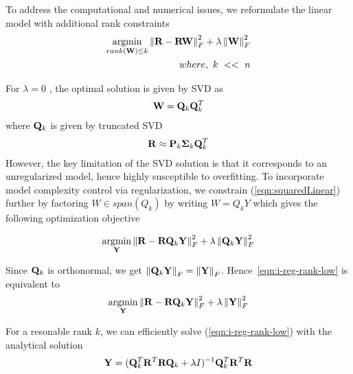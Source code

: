 To address the computational and numerical issues, we reformulate the linear model with additional rank constraints 
\begin{align}
\label{eqn:reg-rank}
\begin{split}
\underset{rank(\mathbf{W}) \le k}{\mathrm{argmin}}  \left \| \mathbf{R} - \mathbf{R}\mathbf{W}\right \|_F^2 + \lambda \left \|  \mathbf{W} \right \|_F^2 \\
where,\ k\ <<\ n 
\end{split}
\end{align}


For $\lambda = 0$ , the optimal solution is given by SVD as
   \begin{align}
   \label{eqn:SVDOptimal}
   \mathbf{W} = \mathbf{Q}_k \mathbf{Q}_k^ T
   \end{align}
where  $\mathbf{Q}_k$ is given by truncated SVD 
   \begin{align*}
   \mathbf{R} \approx \mathbf{P}_k \mathbf{\Sigma}_k \mathbf{Q}_k^T
   \end{align*}
However, the key limitation of the SVD solution is that it corresponds to an unregularized model, hence highly susceptible to overfitting. To incorporate model complexity control via regularization, we constrain (\ref{eqn:squaredLinear}) further by factoring $W\in span(Q_k)$ by writing $W = Q_k Y$ which gives the following optimization objective

\begin{align}
\label{eqn:i-reg-rank-low}
\underset{\mathbf{Y}} {\mathrm{argmin}}  \left \| \mathbf{R} - \mathbf{R} \mathbf{Q}_k \mathbf{Y} \right \|_F^2 + \lambda \left \|  \mathbf{Q}_k \mathbf{Y} \right \|_F^2 
\end{align}

Since $\mathbf{Q}_k$ is orthonormal, we get $\left \| \mathbf{Q}_k \mathbf{Y} \right \|_F = \left \|\mathbf{Y}\right \|_F$. Hence~\ref{eqn:i-reg-rank-low} is equivalent to 
\begin{align}
\underset{\mathbf{Y}}{\mathrm{argmin}} \left \| \mathbf{R} - \mathbf{R}\mathbf{Q}_k\mathbf{Y}\right \|_F^2 + \lambda \left \|  \mathbf{Y} \right \|_F^2 
\end{align}

For a resonable rank $k$, we can efficiently solve (\ref{eqn:i-reg-rank-low}) with the analytical solution 
\begin{align*}
\mathbf{Y} = (\mathbf{Q}_k^T \mathbf{R}^T\mathbf{R}\mathbf{Q}_k +\lambda I)^{-1} \mathbf{Q}_k^T \mathbf{R}^T \mathbf{R}
\end{align*}

